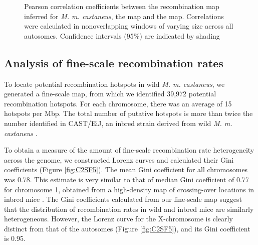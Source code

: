 \linespread{1}
\begin{figure}[h]
   \centering      
   \noindent{}
 \caption[Broad-scale correlations between recombiantion maps for \emph{Mus musculus castaneus} and \emph{Mus musculus domesticus}]{Pearson correlation coefficients between the recombination map inferred for \emph{M. m. castaneus}, the \cite{RN156} map and the \cite{RN232} map. Correlations were calculated in nonoverlapping windows of varying size across all autosomes. Confidence intervals (95\%) are indicated by shading}
\label{fig:C2F3}
\end{figure}
\linespread{2}

\subsection{Analysis of fine-scale recombination rates }

	To locate potential recombination hotspots in wild \textit{M. m. castaneus}, we generated a fine-scale map, from which we identified 39,972 potential recombination hotspots. For each chromosome, there was an average of 15 hotspots per Mbp. The total number of putative hotspots is more than twice the number identified in CAST/EiJ, an inbred strain derived from wild \textit{M. m. castaneus} \citep{RN249}.

	To obtain a measure of the amount of fine-scale recombination rate heterogeneity across the genome, we constructed Lorenz curves and calculated their Gini coefficients (Figure \ref{fig:C2SF5}). The mean Gini coefficient for all chromosomes was 0.78. This estimate is very similar to that of \cite{RN333} median Gini coefficient of 0.77 for chromosome 1, obtained from a high-density map of crossing-over locations in inbred mice \citep{RN263}. The Gini coefficients calculated from our fine-scale map suggest that the distribution of recombination rates in wild and inbred mice are similarly heterogeneous. However, the Lorenz curve for the X-chromosome is clearly distinct from that of the autosomes (Figure \ref{fig:C2SF5}), and its Gini coefficient is 0.95. 

